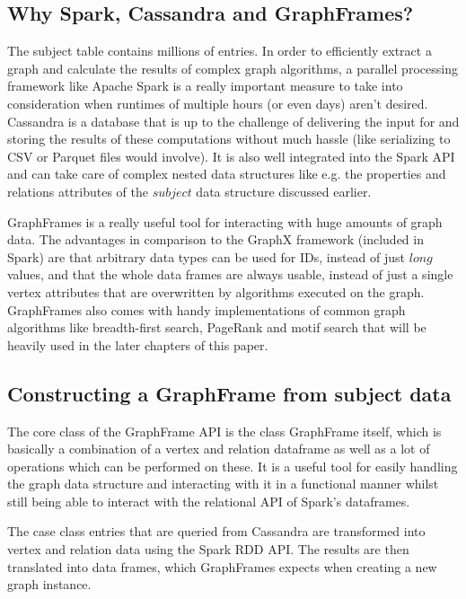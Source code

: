 \documentclass[
        a4paper,     %
        titlepage,   %
        oneside,     %
        parskip      %
        ]{scrartcl}  %
\begin{document}
    \subsection{Why Spark, Cassandra and GraphFrames?}
    The subject table contains millions of entries. In order to efficiently extract
    a graph and calculate the results of complex graph algorithms, a parallel processing
    framework like Apache Spark is a really important measure to take into consideration when runtimes
    of multiple hours (or even days) aren't desired. Cassandra is a database that
    is up to the challenge of delivering the input for and storing the results of
    these computations without much hassle (like serializing to CSV or Parquet files would involve).
    It is also well integrated into the Spark API and can take care of complex nested
    data structures like e.g. the properties and relations attributes of the $subject$
    data structure discussed earlier.

    GraphFrames is a really useful tool for interacting with huge amounts of graph
    data. The advantages in comparison to the GraphX framework (included in Spark) are that arbitrary data types
    can be used for IDs, instead of just $long$ values, and that the whole data frames
    are always usable, instead of just a single vertex attributes that are overwritten
    by algorithms executed on the graph. GraphFrames also comes with handy implementations
    of common graph algorithms like breadth-first search, PageRank and motif search
    that will be heavily used in the later chapters of this paper.

    \subsection{Constructing a GraphFrame from subject data}
    The core class of the GraphFrame API is the class GraphFrame itself, which
    is basically a combination of a vertex and relation dataframe as well as a
    lot of operations which can be performed on these. It is a useful tool for
    easily handling the graph data structure and interacting with it in a functional
    manner whilst still being able to interact with the relational API of Spark's dataframes.

    The case class entries that are queried from Cassandra are transformed into vertex
    and relation data using the Spark RDD API. The results are then translated into
    data frames, which GraphFrames expects when creating a new graph instance.
\end{document}
